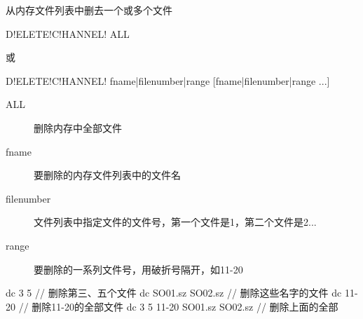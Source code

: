 \label{cmd:deletechannel}

从内存文件列表中删去一个或多个文件

\begin{SACSTX}
D!ELETE!C!HANNEL! ALL
\end{SACSTX}
或
\begin{SACSTX}
D!ELETE!C!HANNEL! fname|filenumber|range [fname|filenumber|range ...]
\end{SACSTX}

\begin{description}
\item [ALL] 删除内存中全部文件
\item [fname] 要删除的内存文件列表中的文件名
\item [filenumber] 文件列表中指定文件的文件号，第一个文件是1，第二个文件是2...
\item [range] 要删除的一系列文件号，用破折号隔开，如11-20
\end{description}

\begin{SACCode}
  dc 3 5                         // 删除第三、五个文件
  dc SO01.sz SO02.sz             // 删除这些名字的文件
  dc 11-20                       // 删除11-20的全部文件
  dc 3 5 11-20 SO01.sz SO02.sz   // 删除上面的全部
\end{SACCode}
